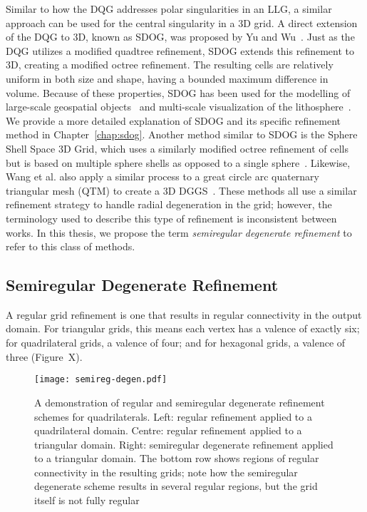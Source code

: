 Similar to how the DQG addresses polar singularities in an LLG, a similar approach can be used for the central singularity in a 3D grid.
A direct extension of the DQG to 3D, known as SDOG, was proposed by Yu and Wu~\cite{yu2009sdog}.
Just as the DQG utilizes a modified quadtree refinement, SDOG extends this refinement to 3D, creating a modified octree refinement.
The resulting cells are relatively uniform in both size and shape, having a bounded maximum difference in volume.
Because of these properties, SDOG has been used for the modelling of large-scale geospatial objects~\cite{yu2012large-scale} and multi-scale visualization of the lithosphere~\cite{yu2012lithosphere}.
We provide a more detailed explanation of SDOG and its specific refinement method in Chapter~\ref{chap:sdog}.
Another method similar to SDOG is the Sphere Shell Space 3D Grid, which uses a similarly modified octree refinement of cells but is based on multiple sphere shells as opposed to a single sphere~\cite{gang2013sphere}.
Likewise, Wang et al. also apply a similar process to a great circle arc quaternary triangular mesh (QTM) to create a 3D DGGS~\cite{wang2013global}.
These methods all use a similar refinement strategy to handle radial degeneration in the grid; however, the terminology used to describe this type of refinement is inconsistent between works.
In this thesis, we propose the term \textit{semiregular degenerate refinement} to refer to this class of methods.


\subsection{Semiregular Degenerate Refinement} \label{chap:3:semiregDegen}
A regular grid refinement is one that results in regular connectivity in the output domain.
For triangular grids, this means each vertex has a valence of exactly six; for quadrilateral grids, a valence of four; and for hexagonal grids, a valence of three (Figure~X).


\begin{figure}[h]
	\centering
	\texttt{[image: semireg-degen.pdf]}
	\caption[Comparison of Regular and Semiregular Degenerate Refinement]{
		A demonstration of regular and semiregular degenerate refinement schemes for quadrilaterals.
		Left: regular refinement applied to a quadrilateral domain.
		Centre: regular refinement applied to a triangular domain.
		Right: semiregular degenerate refinement applied to a triangular domain.
		The bottom row shows regions of regular connectivity in the resulting grids; note how the semiregular degenerate scheme results in several regular regions, but the grid itself is not fully regular
	}
	\label{fig:semireg-degen}
\end{figure}



